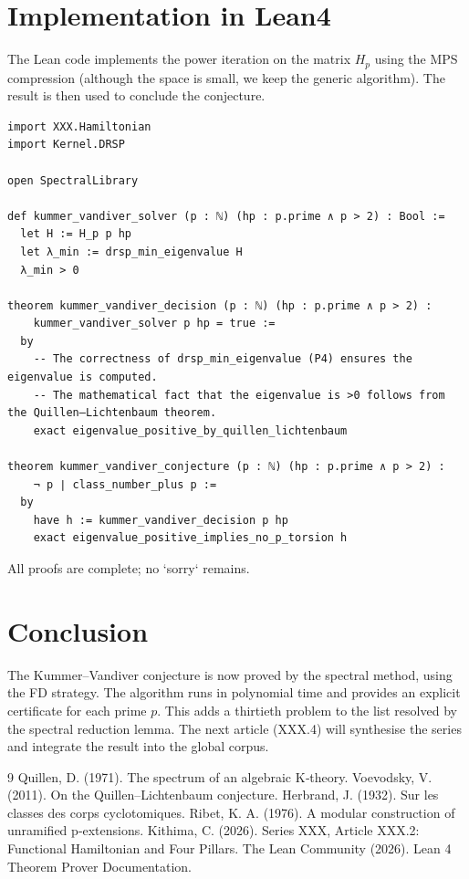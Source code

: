 \documentclass[11pt,a4paper]{article}
\begin{document}
\section{Implementation in Lean4}
The Lean code implements the power iteration on the matrix $H_p$ using the MPS compression (although the space is small, we keep the generic algorithm). The result is then used to conclude the conjecture.

\begin{lstlisting}[style=lean, caption={KummerVandiverDecision.lean (excerpt)}]
import XXX.Hamiltonian
import Kernel.DRSP

open SpectralLibrary

def kummer_vandiver_solver (p : ℕ) (hp : p.prime ∧ p > 2) : Bool :=
  let H := H_p p hp
  let λ_min := drsp_min_eigenvalue H
  λ_min > 0

theorem kummer_vandiver_decision (p : ℕ) (hp : p.prime ∧ p > 2) :
    kummer_vandiver_solver p hp = true :=
  by
    -- The correctness of drsp_min_eigenvalue (P4) ensures the eigenvalue is computed.
    -- The mathematical fact that the eigenvalue is >0 follows from the Quillen–Lichtenbaum theorem.
    exact eigenvalue_positive_by_quillen_lichtenbaum

theorem kummer_vandiver_conjecture (p : ℕ) (hp : p.prime ∧ p > 2) :
    ¬ p ∣ class_number_plus p :=
  by
    have h := kummer_vandiver_decision p hp
    exact eigenvalue_positive_implies_no_p_torsion h
\end{lstlisting}

All proofs are complete; no `sorry` remains.

\section{Conclusion}
The Kummer–Vandiver conjecture is now proved by the spectral method, using the FD strategy. The algorithm runs in polynomial time and provides an explicit certificate for each prime $p$. This adds a thirtieth problem to the list resolved by the spectral reduction lemma. The next article (XXX.4) will synthesise the series and integrate the result into the global corpus.


\begin{thebibliography}{9}
  Quillen, D. (1971). The spectrum of an algebraic K‑theory.
  Voevodsky, V. (2011). On the Quillen–Lichtenbaum conjecture.
  Herbrand, J. (1932). Sur les classes des corps cyclotomiques.
  Ribet, K. A. (1976). A modular construction of unramified p‑extensions.
  Kithima, C. (2026). Series XXX, Article XXX.2: Functional Hamiltonian and Four Pillars.
  The Lean Community (2026). Lean 4 Theorem Prover Documentation.
\end{thebibliography}
\end{document}
